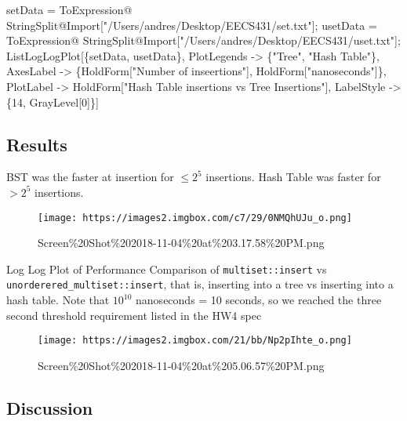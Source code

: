 \documentclass[11pt]{article}
\makeatletter
\def\maxwidth{\ifdim\Gin@nat@width>\linewidth\linewidth
    \else\Gin@nat@width\fi}
\let\Oldincludegraphics\includegraphics
\renewcommand{\includegraphics}[1]{\Oldincludegraphics[width=.8\maxwidth]{#1}}
\newenvironment{Shaded}{}{}
\newcommand{\DecValTok}[1]{\textcolor[rgb]{0.25,0.63,0.44}{{#1}}}
\newcommand{\FunctionTok}[1]{\textcolor[rgb]{0.02,0.16,0.49}{{#1}}}
\newcommand{\NormalTok}[1]{{#1}}
\def\gt{>}
\makeatother
\begin{document}
\begin{Shaded}
\begin{Highlighting}[]
\NormalTok{setData = }
\NormalTok{  ToExpression@}
\NormalTok{   StringSplit@Import["/Users/andres/Desktop/EECS431/}\FunctionTok{set}\NormalTok{.txt"];}
\NormalTok{usetData = }
\NormalTok{  ToExpression@}
\NormalTok{   StringSplit@Import["/Users/andres/Desktop/EECS431/uset.txt"];}
\FunctionTok{ListLogLogPlot}\NormalTok{[\{setData, usetData\}, }
\NormalTok{ PlotLegends -> \{"Tree", "Hash Table"\}, }
 \FunctionTok{AxesLabel}\NormalTok{ -> \{}\FunctionTok{HoldForm}\NormalTok{["Number of inseertions"], }
   \FunctionTok{HoldForm}\NormalTok{["nanoseconds"]\}, }
 \FunctionTok{PlotLabel}\NormalTok{ -> }\FunctionTok{HoldForm}\NormalTok{["Hash }\FunctionTok{Table}\NormalTok{ insertions vs Tree Insertions"], }
 \FunctionTok{LabelStyle}\NormalTok{ -> \{}\DecValTok{14}\NormalTok{, }\FunctionTok{GrayLevel}\NormalTok{[}\DecValTok{0}\NormalTok{]\}]}
\end{Highlighting}
\end{Shaded}

    \subsection{Results}\label{results}

BST was the faster at insertion for \(\leq 2^5\) insertions. Hash Table
was faster for \(\gt 2^5\) insertions.

    \begin{figure}
\centering
\texttt{[image: https://images2.imgbox.com/c7/29/0NMQhUJu\_o.png]}
\caption{Screen\%20Shot\%202018-11-04\%20at\%203.17.58\%20PM.png}
\end{figure}

Log Log Plot of Performance Comparison of \texttt{multiset::insert} vs
\texttt{unorderered\_multiset::insert}, that is, inserting into a tree
vs inserting into a hash table. Note that \(10^{10}\) nanoseconds = 10
seconds, so we reached the three second threshold requirement listed in
the HW4 spec

    \begin{figure}
\centering
\texttt{[image: https://images2.imgbox.com/21/bb/Np2pIhte\_o.png]}
\caption{Screen\%20Shot\%202018-11-04\%20at\%205.06.57\%20PM.png}
\end{figure}

    \subsection{Discussion}\label{discussion}
\end{document}
